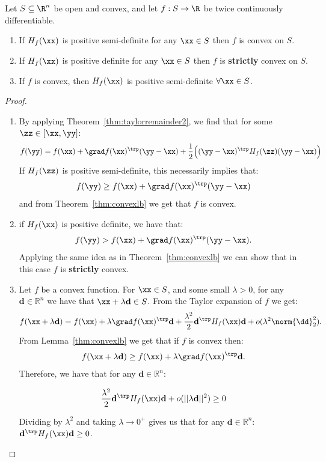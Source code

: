 \begin{theorem}
Let $S \subseteq \R^n$ be open and convex, and let $f:S \to \R$ be twice continuously differentiable.
\begin{enumerate}
\item If $H_{f}(\xx)$ is positive semi-definite for any $\xx \in S$ then $f$ is convex on $S$.
\item If $H_{f}(\xx)$ is positive definite for any $\xx \in S$ then $f$ is \textbf{strictly} convex on $S$.
\item If $f$ is convex, then $H_{f}(\xx)$ is positive semi-definite $\forall \xx \in S$.
\end{enumerate}
\end{theorem}

\begin{proof}
\hspace{0.1in}\newline
\begin{enumerate}
\item By applying Theorem~\ref{thm:taylorremainder2}, we find that for some $\zz \in [\xx,\yy]$:
%
$$f(\yy) = f(\xx) + \grad f(\xx)^\trp (\yy - \xx) + \frac{1}{2} \Big ( (\yy - \xx)^\trp H_{f}(\zz) (\yy - \xx)   \Big )$$
%
If $H_{f}(\zz)$ is positive semi-definite, this necessarily implies that:
%
$$f(\yy) \geq f(\xx) + \grad f(\xx)^\trp (\yy - \xx)$$
%
and from Theorem~\ref{thm:convexlb} we get that $f$ is convex.
%
\item if $H_{f}(\xx)$ is positive definite, we have that:
%
$$f(\yy) > f(\xx) + \grad f(\xx)^\trp (\yy - \xx).$$
%
Applying the same idea as in Theorem~\ref{thm:convexlb} we can show that in this case $f$ is \textbf{strictly} convex.

\item Let $f$ be a convex function.  For $\xx \in S$, and some small $\lambda >0$, for any $\mathbf{d} \in \mathbb{R}^n$ we have that $\xx + \lambda \mathbf{d} \in S$.  From the Taylor expansion of $f$ we get:
%
$$
f(\xx+\lambda \mathbf{d}) = f(\xx) + \lambda \grad f(\xx)^\trp\mathbf{d}
+ \frac{\lambda^2}{2} \mathbf{d}^\trp H_{f}(\xx)  \mathbf{d} +
o(\lambda^2 \norm{\dd}_2^2)
.
$$
%
From Lemma~\ref{thm:convexlb} we get that if $f$ is convex then:
%
$$f(\xx+\lambda\mathbf{d}) \geq f(\xx) + \lambda \grad f(\xx)^\trp \mathbf{d}.$$
%
Therefore, we have that for any $\mathbf{d} \in \mathbb{R}^{n}$:

$$\frac{\lambda^2}{2} \mathbf{d}^\trp H_{f}(\xx)  \mathbf{d} + o(|| \lambda \mathbf{d}||^2) \geq 0$$

Dividing by $\lambda^2$ and taking $\lambda \to 0^+$ gives us that for any $\mathbf{d} \in \mathbb{R}^n$: $\mathbf{d}^\trp H_{f}(\xx)  \mathbf{d} \geq 0$.\qedhere
\end{enumerate}
\end{proof}

